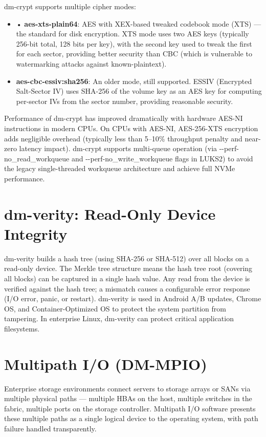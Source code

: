 dm-crypt supports multiple cipher modes:

\begin{itemize}
  \item • \textbf{aes-xts-plain64}: AES with XEX-based tweaked codebook mode (XTS) --- the standard for disk encryption. XTS mode uses two AES keys (typically 256-bit total, 128 bits per key), with the second key used to tweak the first for each sector, providing better security than CBC (which is vulnerable to watermarking attacks against known-plaintext).
  \item \textbf{aes-cbc-essiv:sha256}: An older mode, still supported. ESSIV (Encrypted Salt-Sector IV) uses SHA-256 of the volume key as an AES key for computing per-sector IVs from the sector number, providing reasonable security.
\end{itemize}

Performance of dm-crypt has improved dramatically with hardware AES-NI instructions in modern CPUs. On CPUs with AES-NI, AES-256-XTS encryption adds negligible overhead (typically less than 5--10\% throughput penalty and near-zero latency impact). dm-crypt supports multi-queue operation (via -\/-perf-no\_read\_workqueue and -\/-perf-no\_write\_workqueue flags in LUKS2) to avoid the legacy single-threaded workqueue architecture and achieve full NVMe performance.

\section{dm-verity: Read-Only Device Integrity}
dm-verity builds a hash tree (using SHA-256 or SHA-512) over all blocks on a read-only device. The Merkle tree structure means the hash tree root (covering all blocks) can be captured in a single hash value. Any read from the device is verified against the hash tree; a mismatch causes a configurable error response (I/O error, panic, or restart). dm-verity is used in Android A/B updates, Chrome OS, and Container-Optimized OS to protect the system partition from tampering. In enterprise Linux, dm-verity can protect critical application filesystems.

\section{Multipath I/O (DM-MPIO)}
Enterprise storage environments connect servers to storage arrays or SANs via multiple physical paths --- multiple HBAs on the host, multiple switches in the fabric, multiple ports on the storage controller. Multipath I/O software presents these multiple paths as a single logical device to the operating system, with path failure handled transparently.

